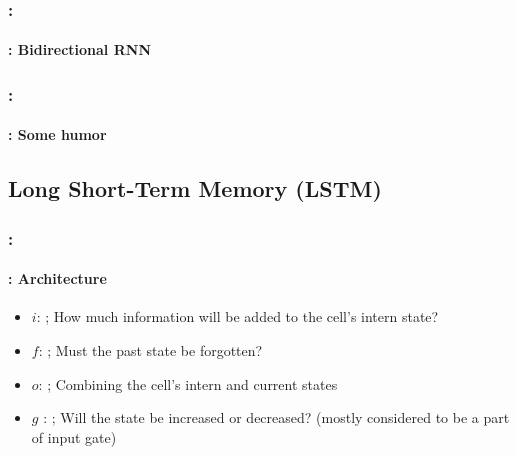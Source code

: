 \documentclass[xcolor=table]{beamer}
\begin{document}
\begin{frame}
	\frametitle{\insertshortsubtitle: \insertsection}
	\framesubtitle{\insertsubsection: Bidirectional RNN}
	
	\begin{center}
	\end{center}
	
\end{frame}

\begin{frame}
	\frametitle{\insertshortsubtitle: \insertsection}
	\framesubtitle{\insertsubsection: Some humor}
	
	\begin{center}
	\end{center}
	
\end{frame}


\subsection{Long Short-Term Memory (LSTM)}

\begin{frame}
	\frametitle{\insertshortsubtitle: \insertsection}
	\framesubtitle{\insertsubsection: Architecture}
	
	\begin{minipage}{0.50\textwidth} 
		\begin{itemize}
			\item $i$: ;
			How much information will be added to the cell's intern state?
			\item $f$: ;
			Must the past state be forgotten?
			\item $o$:  ;
			Combining the cell's intern and current states	
		\end{itemize}
	\end{minipage}
	\begin{minipage}{0.49\textwidth}
	\end{minipage}
	
	\begin{itemize}
		\item $g$ : ;
		Will the state be  increased or decreased?
		(mostly considered to be a part of input gate)
		
	\end{itemize}

\end{frame}
\end{document}
